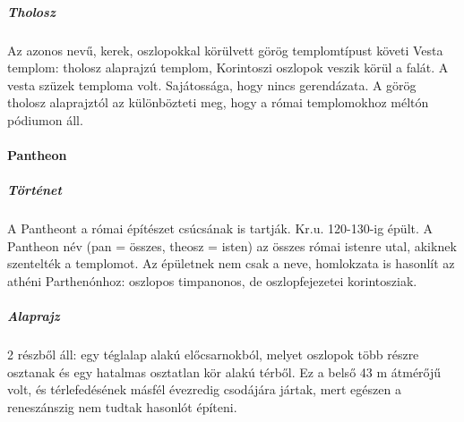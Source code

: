 	\subparagraph{Tholosz}
	Az azonos nevű, kerek, oszlopokkal körülvett görög templomtípust követi
	Vesta templom: tholosz alaprajzú templom, Korintoszi oszlopok veszik körül a falát. A vesta szüzek temploma volt. Sajátossága, hogy nincs gerendázata. A görög tholosz alaprajztól az különbözteti meg, hogy a római templomokhoz méltón pódiumon áll.

\begin{figure}[H]
	\centering
	\begin{minipage}{0.6\textwidth}
	\end{minipage}
	\hfill
	\begin{minipage}{0.35\textwidth}
	\end{minipage}
\end{figure}

\paragraph{Pantheon}

	\subparagraph{Történet}
	A Pantheont a római építészet csúcsának is tartják. Kr.u. 120-130-ig épült. A Pantheon név (pan = összes, theosz = isten) az összes római istenre utal, akiknek szentelték a templomot. Az épületnek nem csak a neve, homlokzata is hasonlít az athéni Parthenónhoz: oszlopos timpanonos, de oszlopfejezetei korintosziak.
	
	\subparagraph{Alaprajz}
	2 részből áll: egy téglalap alakú előcsarnokból, melyet oszlopok több részre osztanak és egy hatalmas osztatlan kör alakú térből. Ez a belső 43 m átmérőjű volt, és térlefedésének másfél évezredig csodájára jártak, mert egészen a reneszánszig nem tudtak hasonlót építeni.

\begin{center}
\end{center}

